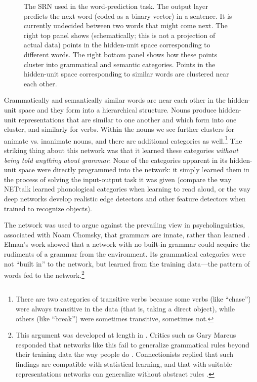 \begin{figure}[htbp]
\centering
{}
\caption[Jeff Yoshimi.]{The SRN used in the word-prediction task. The output layer predicts the next word (coded as a binary vector) in a sentence. It is currently undecided between two words that might come next. The right top panel shows (schematically; this is not a projection of actual data) points in the hidden-unit space corresponding to different words. The right bottom panel shows how these points cluster into grammatical and semantic categories. Points in the hidden-unit space corresponding to similar words are clustered near each other.}
\label{elman_srn_categories}
\end{figure}

Grammatically and semantically similar words are near each other in the hidden-unit space and they form into a hierarchical structure. Nouns produce hidden-unit representations that are similar to one another and which form into one cluster, and similarly for verbs. Within the nouns we see further clusters for animate vs. inanimate nouns, and there are additional categories as well.\footnote{There are two categories of transitive verbs because some verbs (like ``chase'') were always transitive in the data (that is, taking a direct object), while others (like ``break'') were sometimes transitive, sometimes not.}  The striking thing about this network was that it learned these categories \emph{without being told anything about grammar}. None of the categories apparent in its hidden-unit space were directly programmed into the network: it simply learned them in the process of solving the input-output task it was given (compare the way NETtalk learned phonological categories when learning to read aloud, or the way deep networks develop realistic edge detectors and other feature detectors when trained to recognize objects).

The network was used to argue against the prevailing view in psycholinguistics, associated with Noam Chomsky, that grammars are innate, rather than learned \cite{chomsky1965aspects}.  Elman's work showed that a network with no built-in grammar could acquire the rudiments of a grammar from the environment. Its grammatical categories were not ``built in'' to the network, but learned from the training data---the pattern of words fed to the network.\footnote{This argument was developed at length in \cite{elman1996rethinking}. Critics such as Gary Marcus responded that networks like this fail to generalize grammatical rules beyond their training data the way people do \cite{marcus1998rethinking}. Connectionists replied that such findings are compatible with statistical learning, and that with suitable representations networks can generalize without abstract rules \cite{mcclelland1999does}.}

